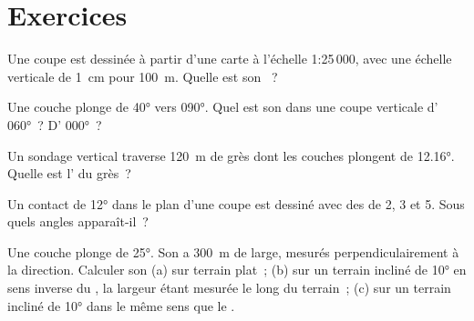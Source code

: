 \section{Exercices}

\begin{exercise}[$\star$]\label{exo:b1:cross-sections:1}
Une coupe est dessinée à partir d'une carte à l'échelle 1:25\,000, avec une
échelle verticale de \qty{1}{cm} pour \qty{100}{m}. Quelle est son ~?
\end{exercise}

\begin{exercise}[$\star$]\label{exo:b1:cross-sections:2}
Une couche plonge de \ang{40} vers \ang{090}. Quel est son  dans
une coupe verticale d' \ang{060}~? D' \ang{000}~?
\end{exercise}

\begin{exercise}[$\star$]\label{exo:b1:cross-sections:3}
Un sondage vertical traverse \qty{120}{m} de grès dont les couches plongent de
\ang{12.16}. Quelle est l' du grès~?
\end{exercise}

\begin{exercise}[$\star$]\label{exo:b1:cross-sections:4}
Un contact de  \ang{12} dans le plan d'une coupe est dessiné avec des
 de 2, 3 et 5. Sous quels angles apparaît-il~?
\end{exercise}

\begin{exercise}[$\star\star$]\label{exo:b1:cross-sections:5}
Une couche plonge de \ang{25}. Son  a \qty{300}{m} de large, mesurés
perpendiculairement à la direction. Calculer son  (a) sur terrain
plat~; (b) sur un terrain incliné de \ang{10} en sens inverse du , la
largeur étant mesurée le long du terrain~; (c) sur un terrain incliné de \ang{10}
dans le même sens que le .
\end{exercise}


